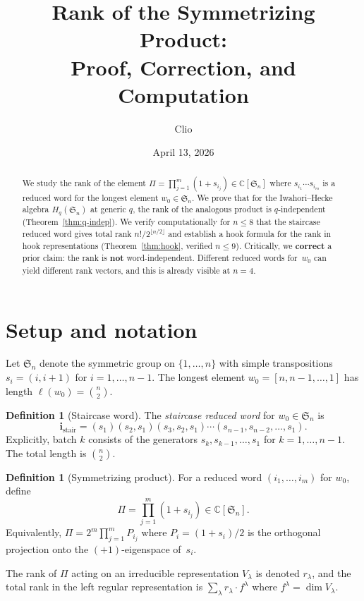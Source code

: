 \documentclass[11pt]{article}
\title{Rank of the Symmetrizing Product: \\
Proof, Correction, and Computation}
\author{Clio}
\date{April 13, 2026}
\theoremstyle{definition}
\newtheorem{definition}[theorem]{Definition}
\theoremstyle{remark}
\newcommand{\CC}{\mathbb{C}}
\newcommand{\Sym}{\mathfrak{S}}
\begin{document}
\maketitle

\begin{abstract}
We study the rank of the element $\Pi = \prod_{j=1}^{m}(1+s_{i_j}) \in \CC[\Sym_n]$
where $s_{i_1}\cdots s_{i_m}$ is a reduced word for the longest element $w_0 \in \Sym_n$.
We prove that for the Iwahori--Hecke algebra $H_q(\Sym_n)$ at generic $q$, the
rank of the analogous product is $q$-independent (Theorem~\ref{thm:q-indep}).
We verify computationally for $n \le 8$ that the staircase reduced word gives
total rank $n!/2^{\lfloor n/2 \rfloor}$ and establish a hook formula for the
rank in hook representations (Theorem~\ref{thm:hook}, verified $n \le 9$).
Critically, we \textbf{correct} a prior claim: the rank is \textbf{not}
word-independent. Different reduced words for~$w_0$ can yield different
rank vectors, and this is already visible at $n = 4$.
\end{abstract}

\section{Setup and notation}

Let $\Sym_n$ denote the symmetric group on $\{1, \dots, n\}$ with simple
transpositions $s_i = (i, i{+}1)$ for $i = 1, \dots, n{-}1$.
The longest element $w_0 = [n, n{-}1, \dots, 1]$ has length
$\ell(w_0) = \binom{n}{2}$.

\begin{definition}[Staircase word]
The \emph{staircase reduced word} for $w_0 \in \Sym_n$ is
\[
  \mathbf{i}_{\mathrm{stair}} = (s_1)(s_2, s_1)(s_3, s_2, s_1)\cdots(s_{n-1}, s_{n-2}, \dots, s_1).
\]
Explicitly, batch $k$ consists of the generators $s_k, s_{k-1}, \dots, s_1$
for $k = 1, \dots, n{-}1$. The total length is $\binom{n}{2}$.
\end{definition}

\begin{definition}[Symmetrizing product]
For a reduced word $(i_1, \dots, i_m)$ for $w_0$, define
\[
  \Pi = \prod_{j=1}^{m} (1 + s_{i_j}) \in \CC[\Sym_n].
\]
Equivalently, $\Pi = 2^m \prod_{j=1}^{m} P_{i_j}$ where
$P_i = (1 + s_i)/2$ is the orthogonal projection onto the
$(+1)$-eigenspace of~$s_i$.
\end{definition}

The rank of $\Pi$ acting on an irreducible representation $V_\lambda$ is
denoted $r_\lambda$, and the total rank in the left regular representation is
$\sum_\lambda r_\lambda \cdot f^\lambda$ where $f^\lambda = \dim V_\lambda$.
\end{document}
